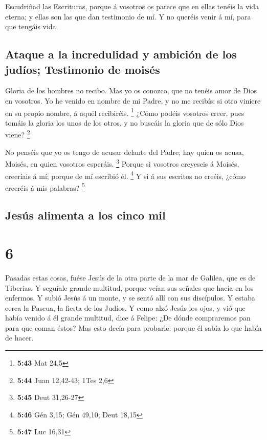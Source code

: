  Escudriñad las Escrituras, porque á vosotros os parece
que en ellas tenéis la vida eterna; y ellas son las que dan testimonio
de mí.  Y no queréis venir á mí, para que tengáis vida.

\hypertarget{ataque-a-la-incredulidad-y-ambiciuxf3n-de-los-juduxedos-testimonio-de-moisuxe9s}{%
\subsection{Ataque a la incredulidad y ambición de los judíos;
Testimonio de
moisés}\label{ataque-a-la-incredulidad-y-ambiciuxf3n-de-los-juduxedos-testimonio-de-moisuxe9s}}

 Gloria de los hombres no recibo.  Mas yo
os conozco, que no tenéis amor de Dios en vosotros.  Yo
he venido en nombre de mi Padre, y no me recibís: si otro viniere en su
propio nombre, á aquél recibiréis. \footnote{\textbf{5:43} Mat 24,5}
 ¿Cómo podéis vosotros creer, pues tomáis la gloria los
unos de los otros, y no buscáis la gloria que de sólo Dios viene?
\footnote{\textbf{5:44} Juan 12,42-43; 1Tes 2,6}

 No penséis que yo os tengo de acusar delante del Padre;
hay quien os acusa, Moisés, en quien vosotros esperáis. \footnote{\textbf{5:45}
  Deut 31,26-27}  Porque si vosotros creyeseis á Moisés,
creeríais á mí; porque de mí escribió él. \footnote{\textbf{5:46} Gén
  3,15; Gén 49,10; Deut 18,15}  Y si á sus escritos no
creéis, ¿cómo creeréis á mis palabras? \footnote{\textbf{5:47} Luc 16,31}

\hypertarget{jesuxfas-alimenta-a-los-cinco-mil}{%
\subsection{Jesús alimenta a los cinco
mil}\label{jesuxfas-alimenta-a-los-cinco-mil}}

\hypertarget{section-5}{%
\section{6}\label{section-5}}

 Pasadas estas cosas, fuése Jesús de la otra parte de la
mar de Galilea, que es de Tiberias.  Y seguíale grande
multitud, porque veían sus señales que hacía en los enfermos.
 Y subió Jesús á un monte, y se sentó allí con sus
discípulos.  Y estaba cerca la Pascua, la fiesta de los
Judíos.  Y como alzó Jesús los ojos, y vió que había
venido á él grande multitud, dice á Felipe: ¿De dónde compraremos pan
para que coman éstos?  Mas esto decía para probarle;
porque él sabía lo que había de hacer.

